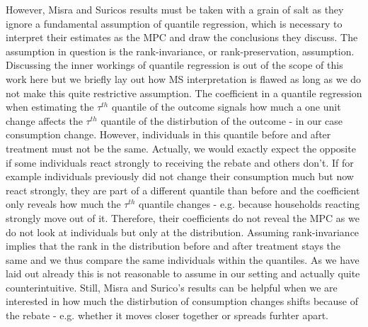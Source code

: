 However, Misra and Suricos results must be taken with a grain of salt as they ignore a fundamental assumption of quantile regression, which is necessary to interpret their estimates as the MPC and draw the conclusions they discuss. The assumption in question is the rank-invariance, or rank-preservation, assumption. Discussing the inner workings of quantile regression is out of the scope of this work here but we briefly lay out how MS interpretation is flawed as long as we do not make this quite restrictive assumption. The coefficient in a quantile regression when estimating the $\tau^{th}$ quantile of the outcome signals how much a one unit change affects the $\tau^{th}$ quantile of the distirbution of the outcome - in our case consumption change. However, individuals in this quantile before and after treatment must not be the same. Actually, we would exactly expect the opposite if some individuals react strongly to receiving the rebate and others don't. If for example individuals previously did not change their consumption much but now react strongly, they are part of a different quantile than before and the coefficient only reveals how much the $\tau^{th}$ quantile changes - e.g. because households reacting strongly move out of it. Therefore, their coefficients do not reveal the MPC as we do not look at individuals but only at the distribution. Assuming rank-invariance implies that the rank in the distribution before and after treatment stays the same and we thus compare the same individuals within the quantiles. As we have laid out already this is not reasonable to assume in our setting and actually quite counterintuitive. Still, Misra and Surico's results can be helpful when we are interested in how much the distirbution of consumption changes shifts because of the rebate - e.g. whether it moves closer together or spreads furhter apart.